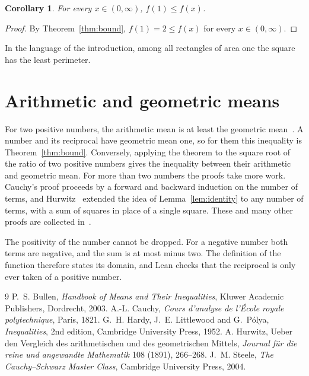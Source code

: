 \documentclass{article}
\newtheorem{corollary}[lemma]{Corollary}
\begin{document}
\begin{corollary}\label{cor:min}
For every $x\in(0,\infty)$, $f(1)\le f(x)$.
\end{corollary}

\begin{proof}
By Theorem~\ref{thm:bound}, $f(1)=2\le f(x)$ for every $x\in(0,\infty)$.
\end{proof}

In the language of the introduction, among all rectangles of area one the square has the least perimeter.

\section{Arithmetic and geometric means}\label{sec:means}

For two positive numbers, the arithmetic mean is at least the geometric mean~\cite{hardy1952}.
A number and its reciprocal have geometric mean one, so for them this inequality is Theorem~\ref{thm:bound}.
Conversely, applying the theorem to the square root of the ratio of two positive numbers gives the inequality between their arithmetic and geometric mean.
For more than two numbers the proofs take more work.
Cauchy's proof proceeds by a forward and backward induction on the number of terms, and Hurwitz~\cite{hurwitz1891} extended the idea of Lemma~\ref{lem:identity} to any number of terms, with a sum of squares in place of a single square.
These and many other proofs are collected in~\cite{bullen2003,steele2004}.

The positivity of the number cannot be dropped.
For a negative number both terms are negative, and the sum is at most minus two.
The definition of the function therefore states its domain, and Lean checks that the reciprocal is only ever taken of a positive number.

\begin{thebibliography}{9}
 P.~S. Bullen, \emph{Handbook of Means and Their Inequalities}, Kluwer Academic Publishers, Dordrecht, 2003.
 A.-L. Cauchy, \emph{Cours d'analyse de l'\'Ecole royale polytechnique}, Paris, 1821.
 G.~H. Hardy, J.~E. Littlewood and G.~P\'olya, \emph{Inequalities}, 2nd edition, Cambridge University Press, 1952.
 A. Hurwitz, Ueber den Vergleich des arithmetischen und des geometrischen Mittels, \emph{Journal f\"ur die reine und angewandte Mathematik} 108 (1891), 266--268.
 J.~M. Steele, \emph{The Cauchy--Schwarz Master Class}, Cambridge University Press, 2004.
\end{thebibliography}
\end{document}
